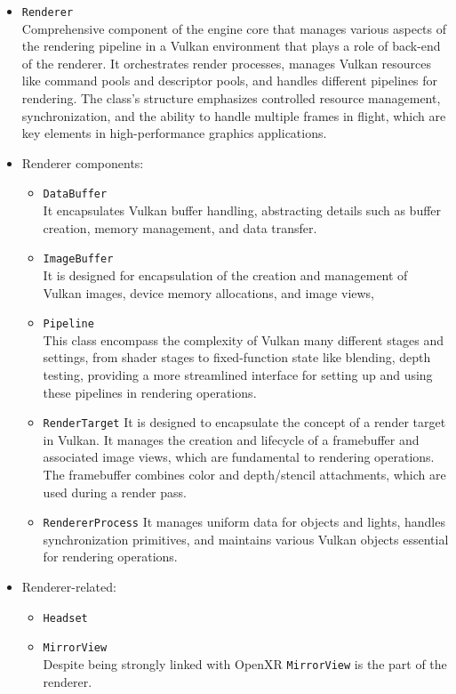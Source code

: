 \begin{itemize}
    \item \texttt{Renderer}\\
    Comprehensive component of the engine core that manages various aspects of the rendering pipeline in a Vulkan environment that plays a role of back-end of the renderer. It orchestrates render processes, manages Vulkan resources like command pools and descriptor pools, and handles different pipelines for rendering. The class's structure emphasizes controlled resource management, synchronization, and the ability to handle multiple frames in flight, which are key elements in high-performance graphics applications.
    \item Renderer components:
    \begin{itemize}
    \item \texttt{DataBuffer}\\
    It encapsulates Vulkan buffer handling, abstracting details such as buffer creation, memory management, and data transfer.
    \item \texttt{ImageBuffer}\\
    It is designed for encapsulation of the creation and management of Vulkan images, device memory allocations, and image views,
    \item \texttt{Pipeline}\\
    This class encompass the complexity of Vulkan many different stages and settings, from shader stages to fixed-function state like blending, depth testing, providing a more streamlined interface for setting up and using these pipelines in rendering operations. 
    \item \texttt{RenderTarget}
    It is designed to encapsulate the concept of a render target in Vulkan. It manages the creation and lifecycle of a framebuffer and associated image views, which are fundamental to rendering operations. The framebuffer combines color and depth/stencil attachments, which are used during a render pass. 
    \item \texttt{RendererProcess}
    It manages uniform data for objects and lights, handles synchronization primitives, and maintains various Vulkan objects essential for rendering operations.
    \end{itemize}
    \item Renderer-related:
    \begin{itemize}
        \item \texttt{Headset}\\
        \label{sec:headset}
        \item \texttt{MirrorView}\\
        Despite being strongly linked with OpenXR \texttt{MirrorView} is the part of the renderer. 
    \end{itemize}
\end{itemize}